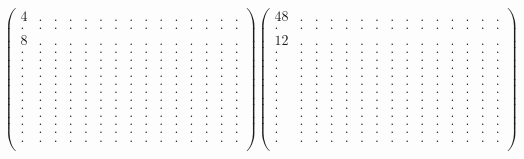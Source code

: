 \documentclass[12pt,a4paper]{amsart}
\begin{document}
\begin{align*}
\left(\begin{array}{rrrrrrrrrrrrrrr}%
4&.&.&.&.&.&.&.&.&.&.&.&.&.&.\\%
.&.&.&.&.&.&.&.&.&.&.&.&.&.&.\\%
8&.&.&.&.&.&.&.&.&.&.&.&.&.&.\\%
.&.&.&.&.&.&.&.&.&.&.&.&.&.&.\\%
.&.&.&.&.&.&.&.&.&.&.&.&.&.&.\\%
.&.&.&.&.&.&.&.&.&.&.&.&.&.&.\\%
.&.&.&.&.&.&.&.&.&.&.&.&.&.&.\\%
.&.&.&.&.&.&.&.&.&.&.&.&.&.&.\\%
.&.&.&.&.&.&.&.&.&.&.&.&.&.&.\\%
.&.&.&.&.&.&.&.&.&.&.&.&.&.&.\\%
.&.&.&.&.&.&.&.&.&.&.&.&.&.&.\\%
.&.&.&.&.&.&.&.&.&.&.&.&.&.&.\\%
.&.&.&.&.&.&.&.&.&.&.&.&.&.&.\\%
.&.&.&.&.&.&.&.&.&.&.&.&.&.&.\\%
.&.&.&.&.&.&.&.&.&.&.&.&.&.&.\\%
\end{array}\right)%
\left(\begin{array}{rrrrrrrrrrrrrrr}%
48&.&.&.&.&.&.&.&.&.&.&.&.&.&.\\%
.&.&.&.&.&.&.&.&.&.&.&.&.&.&.\\%
12&.&.&.&.&.&.&.&.&.&.&.&.&.&.\\%
.&.&.&.&.&.&.&.&.&.&.&.&.&.&.\\%
.&.&.&.&.&.&.&.&.&.&.&.&.&.&.\\%
.&.&.&.&.&.&.&.&.&.&.&.&.&.&.\\%
.&.&.&.&.&.&.&.&.&.&.&.&.&.&.\\%
.&.&.&.&.&.&.&.&.&.&.&.&.&.&.\\%
.&.&.&.&.&.&.&.&.&.&.&.&.&.&.\\%
.&.&.&.&.&.&.&.&.&.&.&.&.&.&.\\%
.&.&.&.&.&.&.&.&.&.&.&.&.&.&.\\%
.&.&.&.&.&.&.&.&.&.&.&.&.&.&.\\%
.&.&.&.&.&.&.&.&.&.&.&.&.&.&.\\%
.&.&.&.&.&.&.&.&.&.&.&.&.&.&.\\%
.&.&.&.&.&.&.&.&.&.&.&.&.&.&.\\%
\end{array}\right)%
\end{align*}
\end{document}
